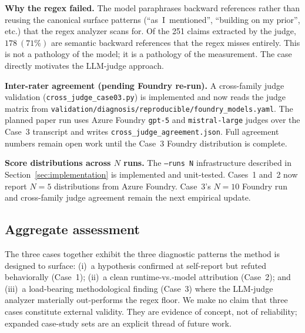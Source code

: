 \textbf{Why the regex failed.} The model paraphrases backward
references rather than reusing the canonical surface patterns
(``as~I~mentioned'', ``building on my prior'', etc.) that the regex
analyzer scans for. Of the 251 claims extracted by the judge,
$178~(71\%)$ are semantic backward references that the regex misses
entirely. This is not a pathology of the model; it is a pathology of
the measurement. The case directly motivates the LLM-judge approach.

\textbf{Inter-rater agreement (pending Foundry re-run).} A
cross-family judge validation (\texttt{cross\_judge\_case03.py}) is
implemented and now reads the judge matrix from
\texttt{validation/diagnosis/reproducible/foundry\_models.yaml}. The planned
paper run uses Azure Foundry \texttt{gpt-5} and \texttt{mistral-large}
judges over the Case~3 transcript and writes
\texttt{cross\_judge\_agreement.json}. Full agreement numbers remain
open work until the Case~3 Foundry distribution is complete.

\textbf{Score distributions across $N$ runs.} The \texttt{--runs N}
infrastructure described in Section~\ref{sec:implementation} is
implemented and unit-tested. Cases~1 and~2 now report $N=5$
distributions from Azure Foundry. Case~3's $N=10$ Foundry run and
cross-family judge agreement remain the next empirical update.

\subsection{Aggregate assessment}

The three cases together exhibit the three diagnostic patterns the
method is designed to surface: (i)~a hypothesis confirmed at
self-report but refuted behaviorally (Case~1); (ii)~a clean
runtime-vs.-model attribution (Case~2); and (iii)~a load-bearing
methodological finding (Case~3) where the LLM-judge analyzer
materially out-performs the regex floor. We make no claim that three
cases constitute external validity. They are evidence of concept, not
of reliability; expanded case-study sets are an explicit thread of
future work.
